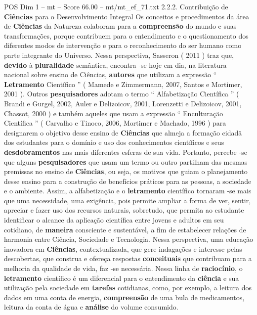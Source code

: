 \begin{textsample}{POS Dim 1 – mt – Score 66.00 – mt/mt\_ef\_71.txt}  \label{ex:f1_pos_076}
2.2.2.
Contribuição de \textbf{Ciências} para o Desenvolvimento Integral Os conceitos e procedimentos da área de \textbf{Ciências} da Natureza colaboram para a \textbf{compreensão} do mundo e suas transformações, porque contribuem para o entendimento e o questionamento dos diferentes modos de intervenção e para o reconhecimento do ser humano como parte integrante do Universo.
Nessa perspectiva, Sasseron ( 2011 ) traz que, \textbf{devido} à \textbf{pluralidade} semântica, encontra -se hoje em dia, na literatura nacional sobre ensino de Ciências, \textbf{autores} que utilizam a expressão “ \textbf{Letramento} Científico ” ( Mamede e Zimmermann, 2007, Santos e Mortimer, 2001 ).
Outros \textbf{pesquisadores} adotam o termo “ Alfabetização Científica ” ( Brandi e Gurgel, 2002, Auler e Delizoicov, 2001, Lorenzetti e Delizoicov, 2001, Chassot, 2000 ) e também aqueles que usam a expressão “ Enculturação Científica ” ( Carvalho e Tinoco, 2006, Mortimer e Machado, 1996 ) para designarem o objetivo desse ensino de \textbf{Ciências} que almeja a formação cidadã dos estudantes para o domínio e uso dos conhecimentos científicos e seus \textbf{desdobramentos} nas mais diferentes esferas de sua vida.
Portanto, percebe -se que alguns \textbf{pesquisadores} que usam um termo ou outro partilham das mesmas premissas no ensino de \textbf{Ciências}, ou seja, os motivos que guiam o planejamento desse ensino para a construção de benefícios práticos para as pessoas, a sociedade e o ambiente.
Assim, a alfabetização e o \textbf{letramento} científico tornaram -se mais que uma necessidade, uma exigência, pois permite ampliar a forma de ver, sentir, apreciar e fazer uso dos recursos naturais, sobretudo, que permita ao estudante identificar o alcance da aplicação científica entre jovens e adultos em seu cotidiano, de \textbf{maneira} consciente e sustentável, a fim de estabelecer relações de harmonia entre Ciência, Sociedade e Tecnologia.
Nessa perspectiva, uma educação inovadora em \textbf{Ciências}, contextualizada, que gere indagações e interesse pelas descobertas, que construa e ofereça respostas \textbf{conceituais} que contribuam para a melhoria da qualidade de vida, faz -se necessária.
Nessa linha de \textbf{raciocínio}, o \textbf{letramento} científico é um diferencial para o entendimento da \textbf{ciência} e sua utilização pela sociedade em \textbf{tarefas} cotidianas, como, por exemplo, a leitura dos dados em uma conta de energia, \textbf{compreensão} de uma bula de medicamentos, leitura da conta de água e \textbf{análise} do volume consumido.

\end{textsample}

